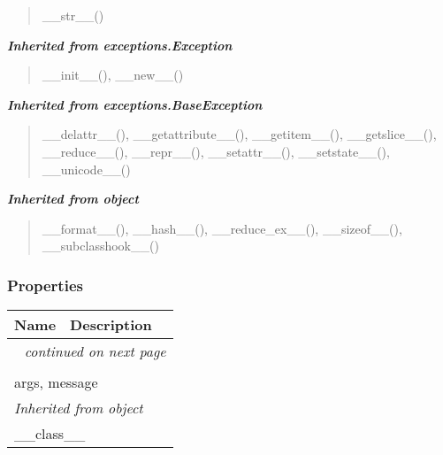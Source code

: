 \begin{quote}
\_\_str\_\_()
\end{quote}

\large{\textbf{\textit{Inherited from exceptions.Exception}}}

\begin{quote}
\_\_init\_\_(), \_\_new\_\_()
\end{quote}

\large{\textbf{\textit{Inherited from exceptions.BaseException}}}

\begin{quote}
\_\_delattr\_\_(), \_\_getattribute\_\_(), \_\_getitem\_\_(), \_\_getslice\_\_(), \_\_reduce\_\_(), \_\_repr\_\_(), \_\_setattr\_\_(), \_\_setstate\_\_(), \_\_unicode\_\_()
\end{quote}

\large{\textbf{\textit{Inherited from object}}}

\begin{quote}
\_\_format\_\_(), \_\_hash\_\_(), \_\_reduce\_ex\_\_(), \_\_sizeof\_\_(), \_\_subclasshook\_\_()
\end{quote}


  \subsubsection{Properties}

    \vspace{-1cm}
\hspace{\varindent}\begin{longtable}{|p{\varnamewidth}|p{\vardescrwidth}|l}
\cline{1-2}
\cline{1-2} \centering \textbf{Name} & \centering \textbf{Description}& \\
\cline{1-2}
\endhead\cline{1-2}\multicolumn{3}{r}{\small\textit{continued on next page}}\\\endfoot\cline{1-2}
\endlastfoot\multicolumn{2}{|l|}{\textit{Inherited from exceptions.BaseException}}\\
\multicolumn{2}{|p{\varwidth}|}{\raggedright args, message}\\
\cline{1-2}
\multicolumn{2}{|l|}{\textit{Inherited from object}}\\
\multicolumn{2}{|p{\varwidth}|}{\raggedright \_\_class\_\_}\\
\cline{1-2}
\end{longtable}

